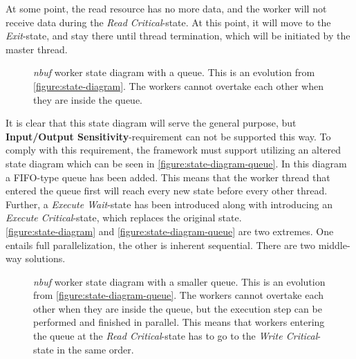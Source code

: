 \documentclass[a4paper]{article}
\newcommand{\nbuf}{\textit{nbuf} }
\begin{document}
At some point, the read resource has no more data, and the worker will not receive data during the \textit{Read Critical}-state. At this point, it will move to the \textit{Exit}-state, and stay there until thread termination, which will be initiated by the master thread.\\

\begin{figure}
	\begin{adjustwidth}{-0.5in}{-0.5in}
    \centering
    \def\svgwidth{\columnwidth}
    
  	\caption{\nbuf worker state diagram with a queue. This is an evolution from \autoref{figure:state-diagram}. The workers cannot overtake each other when they are inside the queue.}
	\label{figure:state-diagram-queue}
	\end{adjustwidth}
\end{figure}

It is clear that this state diagram will serve the general purpose, but \textbf{Input/Output Sensitivity}-requirement can not be supported this way. To comply with this requirement, the framework must support utilizing an altered state diagram which can be seen in \autoref{figure:state-diagram-queue}. In this diagram a FIFO-type queue has been added. This means that the worker thread that entered the queue first will reach every new state before every other thread. Further, a \textit{Execute Wait}-state has been introduced along with introducing an \textit{Execute Critical}-state, which replaces the original state.\\



\autoref{figure:state-diagram} and \autoref{figure:state-diagram-queue} are two extremes. One entails full parallelization, the other is inherent sequential. There are two middle-way solutions. 

\begin{figure}
	\begin{adjustwidth}{-0.5in}{-0.5in}
    \centering
    \def\svgwidth{\columnwidth}
    
  	\caption{\nbuf worker state diagram with a smaller queue. This is an evolution from \autoref{figure:state-diagram-queue}. The workers cannot overtake each other when they are inside the queue, but the execution step can be performed and finished in parallel. This means that workers entering the queue at the \textit{Read Critical}-state has to go to the \textit{Write Critical}-state in the same order.}
	\label{figure:state-diagram-semi-queue}
	\end{adjustwidth}
\end{figure}
\end{document}
